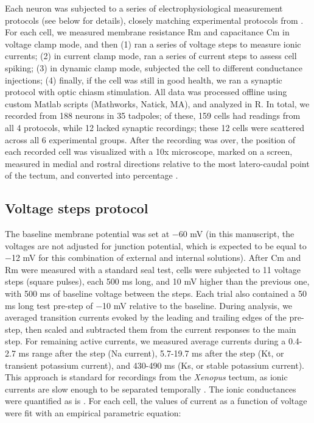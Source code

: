 \documentclass{article}
\begin{document}
Each neuron was subjected to a series of electrophysiological measurement protocols (see below for details), closely matching experimental protocols from \citep{ciarleglio2015}. For each cell, we measured membrane resistance Rm and capacitance Cm in voltage clamp mode, and then (1) ran a series of voltage steps to measure ionic currents; (2) in current clamp mode, ran a series of current steps to assess cell spiking; (3) in dynamic clamp mode, subjected the cell to different conductance injections; (4) finally, if the cell was still in good health, we ran a synaptic protocol with optic chiasm stimulation. All data was processed offline using custom Matlab scripts (Mathworks, Natick, MA), and analyzed in R. In total, we recorded from 188 neurons in 35 tadpoles; of these, 159 cells had readings from all 4 protocols, while 12 lacked synaptic recordings; these 12 cells were scattered across all 6 experimental groups. After the recording was over, the position of each recorded cell was visualized with a 10x microscope, marked on a screen, measured in medial and rostral directions relative to the most latero-caudal point of the tectum, and converted into percentage \citep{hamodi2014}.

\subsection*{Voltage steps protocol}

The baseline membrane potential was set at $-$60 mV (in this manuscript, the voltages are not adjusted for junction potential, which is expected to be equal to $-$12 mV for this combination of external and internal solutions). After Cm and Rm were measured with a standard seal test, cells were subjected to 11 voltage steps (square pulses), each 500 ms long, and 10 mV higher than the previous one, with 500 ms of baseline voltage between the steps. Each trial also contained a 50 ms long test pre-step of $-$10 mV relative to the baseline. During analysis, we averaged transition currents evoked by the leading and trailing edges of the pre-step, then scaled and subtracted them from the current responses to the main step. For remaining active currents, we measured average currents during a 0.4-2.7 ms range after the step (Na current), 5.7-19.7 ms after the step (Kt, or transient potassium current), and 430-490 ms (Ks, or stable potassium current). This approach is standard for recordings from the \textit{Xenopus} tectum, as ionic currents are slow enough to be separated temporally \citep{aizenman2003}. The ionic conductances were quantified as is \citep{ciarleglio2015}. For each cell, the values of current as a function of voltage were fit with an empirical parametric equation:
\end{document}
